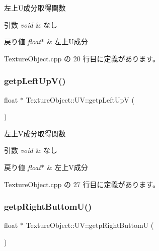 左上\+U成分取得関数 


\begin{DoxyParams}{引数}
{\em void} & なし \\
\hline
\end{DoxyParams}

\begin{DoxyRetVals}{戻り値}
{\em float$\ast$} & 左上\+U成分 \\
\hline
\end{DoxyRetVals}


 Texture\+Object.\+cpp の 20 行目に定義があります。

\mbox{\label{class_texture_object_1_1_u_v_a78e627051e90d91ee6f28abb22d00f5a}} 
\subsubsection{\texorpdfstring{getp\+Left\+Up\+V()}{getpLeftUpV()}}
{\footnotesize\ttfamily float $\ast$ Texture\+Object\+::\+U\+V\+::getp\+Left\+UpV (\begin{DoxyParamCaption}{ }\end{DoxyParamCaption})}



左上\+V成分取得関数 


\begin{DoxyParams}{引数}
{\em void} & なし \\
\hline
\end{DoxyParams}

\begin{DoxyRetVals}{戻り値}
{\em float$\ast$} & 左上\+V成分 \\
\hline
\end{DoxyRetVals}


 Texture\+Object.\+cpp の 27 行目に定義があります。

\mbox{\label{class_texture_object_1_1_u_v_a3e99bc0b056f17288f5aee1a3b81b60a}} 
\subsubsection{\texorpdfstring{getp\+Right\+Buttom\+U()}{getpRightButtomU()}}
{\footnotesize\ttfamily float $\ast$ Texture\+Object\+::\+U\+V\+::getp\+Right\+ButtomU (\begin{DoxyParamCaption}{ }\end{DoxyParamCaption})}



